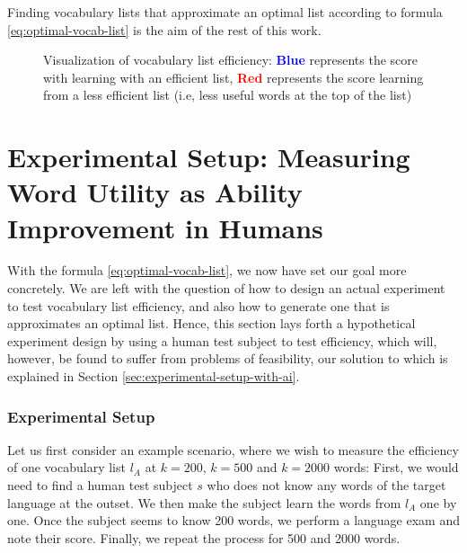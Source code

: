 Finding vocabulary lists that approximate an optimal list according to formula \ref{eq:optimal-vocab-list} is the aim of the rest of this work.

\begin{figure}[H]
	\centering
	\caption{Visualization of vocabulary list efficiency: \textbf{\textcolor{blue}{Blue}} represents the score with learning with an efficient list, \textbf{\textcolor{red}{Red}} represents the score learning from a less efficient list (i.e, less useful words at the top of the list)}
	\label{fig:voc-list-efficiency}
\end{figure}

\section{Experimental Setup: Measuring Word Utility as Ability Improvement in Humans} \label{sec:human-efficiency-testing}
With the formula \ref{eq:optimal-vocab-list}, we now have set our goal more concretely.
We are left with the question of how to design an actual experiment to test vocabulary list efficiency, and also how to generate one that is approximates an optimal list.
Hence, this section lays forth a hypothetical experiment design by using a human test subject to test efficiency, which will, however, be found to suffer from problems of feasibility, our solution to which is explained in Section \ref{sec:experimental-setup-with-ai}.

\subsubsection{Experimental Setup}
Let us first consider an example scenario, where we wish to measure the efficiency of one vocabulary list $l_A$ at $k=200$, $k=500$ and $k=2000$ words:
First, we would need to find a human test subject $s$ who does not know any words of the target language at the outset.
We then make the subject learn the words from $l_A$ one by one.
Once the subject seems to know 200 words, we perform a language exam and note their score.
Finally, we repeat the process for 500 and 2000 words.


